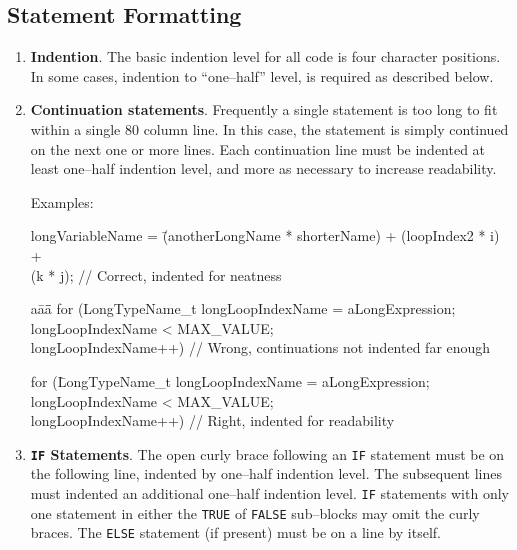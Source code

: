 \documentclass[11pt]{article}
\begin{document}
\subsection{Statement Formatting}
\begin{enumerate}
\item {\bf Indention}.  The basic indention level for all code
is four character positions.  In some cases, indention to ``one--half''
level, is required as described below.
\item {\bf Continuation statements}.  Frequently a single statement
is too long to fit within a single 80 column line.  In this case, the
statement is simply continued on the next one or more lines.  Each
continuation line must be indented at least one--half indention level,
and more as necessary to increase readability.  

Examples:

\begin{tt}
\begin{tabbing}
longVariableName = \=(anotherLongName * shorterName) + (loopIndex2 * i) + \\
\>(k * j); // Correct, indented for neatness
\end{tabbing}
\end{tt}

\begin{tt}
\begin{tabbing}
a\=a\=a\= \kill
for (LongTypeName\_t longLoopIndexName = aLongExpression; \\
\>longLoopIndexName < MAX\_VALUE; \\
\>longLoopIndexName++) // Wrong, continuations not indented far enough
\end{tabbing}
\end{tt}

\begin{tt}
\begin{tabbing}
for (\=LongTypeName\_t longLoopIndexName = aLongExpression; \\
\>longLoopIndexName < MAX\_VALUE; \\
\>longLoopIndexName++) // Right, indented for readability
\end{tabbing}
\end{tt}

\item {\bf {\tt IF} Statements}.
The open curly brace following an {\tt IF} statement must be on the
following line, indented by one--half indention level.
The subsequent lines must
indented an additional one--half indention level.
{\tt IF} statements with only
one statement in either the {\tt TRUE} of {\tt FALSE} sub--blocks
may omit the curly braces.  The {\tt ELSE} statement (if present)
must be on a line by itself.


\end{enumerate}
\end{document}
